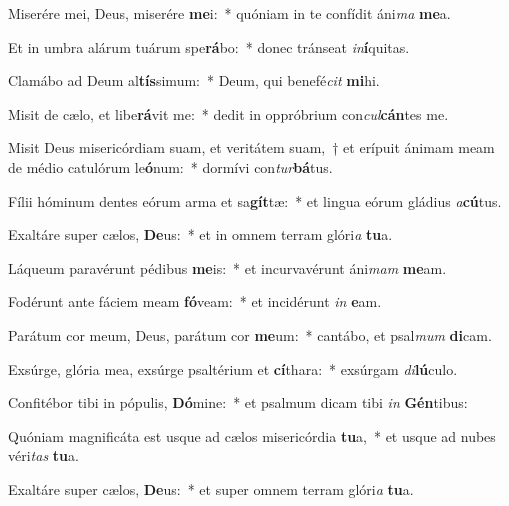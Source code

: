 \item Miserére mei, Deus, miserére \textbf{me}i:~* quóniam in te confídit áni\textit{ma} \textbf{me}a.
\item Et in umbra alárum tuárum spe\textbf{rá}bo:~* donec tránseat \textit{in}\textbf{í}quitas.
\item Clamábo ad Deum al\textbf{tís}simum:~* Deum, qui benefé\textit{cit} \textbf{mi}hi.
\item Misit de cælo, et libe\textbf{rá}vit me:~* dedit in oppróbrium con\textit{cul}\textbf{cán}tes me.
\item Misit Deus misericórdiam suam, et veritátem suam,~† et erípuit ánimam meam de médio catulórum le\textbf{ó}num:~* dormívi con\textit{tur}\textbf{bá}tus.
\item Fílii hóminum dentes eórum arma et sa\textbf{gít}tæ:~* et lingua eórum gládius \textit{a}\textbf{cú}tus.
\item Exaltáre super cælos, \textbf{De}us:~* et in omnem terram glóri\textit{a} \textbf{tu}a.
\item Láqueum paravérunt pédibus \textbf{me}is:~* et incurvavérunt áni\textit{mam} \textbf{me}am.
\item Fodérunt ante fáciem meam \textbf{fó}veam:~* et incidérunt \textit{in} \textbf{e}am.
\item Parátum cor meum, Deus, parátum cor \textbf{me}um:~* cantábo, et psal\textit{mum} \textbf{di}cam.
\item Exsúrge, glória mea, exsúrge psaltérium et \textbf{cí}thara:~* exsúrgam \textit{di}\textbf{lú}culo.
\item Confitébor tibi in pópulis, \textbf{Dó}mine:~* et psalmum dicam tibi \textit{in} \textbf{Gén}tibus:
\item Quóniam magnificáta est usque ad cælos misericórdia \textbf{tu}a,~* et usque ad nubes véri\textit{tas} \textbf{tu}a.
\item Exaltáre super cælos, \textbf{De}us:~* et super omnem terram glóri\textit{a} \textbf{tu}a.
